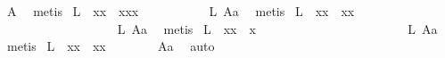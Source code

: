 \begin{isabellebody}
\isamarkupfalse%
\ A{}\ \isamarkupfalse%
\ metis%
\endisatagproof
{\isafoldproof}%
%
\isadelimproof
%
\endisadelimproof
\isanewline
{}\isamarkupfalse%
\ L{}{\isacharcolon}\ \ {\isachardoublequoteopen}{\isacharparenleft}{\isasymbox}{\isasymbox}x{\isacharparenright}{\isasymcdot}x\ {\isasymapprox}\ {\isacharparenleft}{\isacharparenleft}{\isasymbox}{\isasymbox}x{\isacharparenright}{\isasymcdot}{\isacharparenleft}{\isasymbox}x{\isacharparenright}{\isacharparenright}{\isasymcdot}x{\isachardoublequoteclose}%
\isadelimproof
\ \ \ \ \ \ \ \ \ %
\endisadelimproof
%
\isatagproof
{}\isamarkupfalse%
\ L{}\ A{}a\ \isamarkupfalse%
\ metis%
\endisatagproof
{\isafoldproof}%
%
\isadelimproof
%
\endisadelimproof
\isanewline
{}\isamarkupfalse%
\ L{}{\isacharcolon}\ \ {\isachardoublequoteopen}{\isacharparenleft}{\isasymbox}{\isasymbox}x{\isacharparenright}{\isasymcdot}x\ {\isasymapprox}\ {\isacharparenleft}{\isasymbox}x{\isacharparenright}{\isasymcdot}x{\isachardoublequoteclose}%
\isadelimproof
\ \ \ \ \ \ \ \ \ \ \ \ \ \ \ \ \ %
\endisadelimproof
%
\isatagproof
{}\isamarkupfalse%
\ L{}\ A{}a\ \isamarkupfalse%
\ metis%
\endisatagproof
{\isafoldproof}%
%
\isadelimproof
%
\endisadelimproof
\isanewline
{}\isamarkupfalse%
\ L{}{\isacharcolon}\ \ {\isachardoublequoteopen}{\isacharparenleft}{\isasymbox}{\isasymbox}x{\isacharparenright}{\isasymcdot}x\ {\isasymapprox}\ x{\isachardoublequoteclose}%
\isadelimproof
\ \ \ \ \ \ \ \ \ \ \ \ \ \ \ \ \ \ \ \ \ \ %
\endisadelimproof
%
\isatagproof
{}\isamarkupfalse%
\ L{}\ A{}a\ \isamarkupfalse%
\ metis%
\endisatagproof
{\isafoldproof}%
%
\isadelimproof
%
\endisadelimproof
\isanewline
{}\isamarkupfalse%
\ L{}{\isacharcolon}\ \ {\isachardoublequoteopen}{\isasymbox}{\isacharparenleft}{\isacharparenleft}{\isasymbox}{\isasymbox}x{\isacharparenright}{\isasymcdot}x{\isacharparenright}\ {\isasymapprox}\ {\isasymbox}{\isacharparenleft}{\isacharparenleft}{\isasymbox}{\isasymbox}x{\isacharparenright}{\isasymcdot}{\isacharparenleft}{\isasymbox}x{\isacharparenright}{\isacharparenright}{\isachardoublequoteclose}%
\isadelimproof
\ \ \ \ \ \ %
\endisadelimproof
%
\isatagproof
{}\isamarkupfalse%
\ A{}a\ \isamarkupfalse%
\ auto%
\endisatagproof
{\isafoldproof}%
%
\isadelimproof
%
\endisadelimproof
\isanewline

\end{isabellebody}
